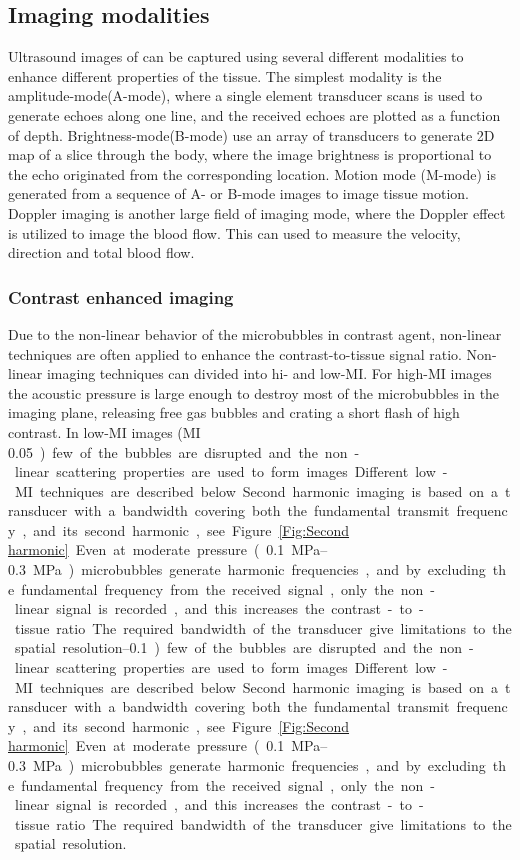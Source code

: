   


\subsection{Imaging modalities}
Ultrasound images of can be captured using several different modalities to enhance different properties of the tissue. The simplest modality is the amplitude-mode(A-mode), where a single element transducer scans is used to generate echoes along one line, and the received echoes are plotted as a function of depth. Brightness-mode(B-mode) use an array of transducers to generate 2D map of a slice through the body, where the image brightness is proportional to the echo originated from the corresponding location. Motion mode (M-mode) is generated from a sequence of A- or B-mode images to image tissue motion. Doppler imaging is another large field of imaging mode, where the Doppler effect is utilized to image the blood flow. This can used to measure the velocity, direction and total blood flow.    

\subsubsection{Contrast enhanced imaging}
\label{sec:contrast img}
Due to the non-linear behavior of the microbubbles in contrast agent, non-linear techniques are often applied to enhance the contrast-to-tissue signal ratio. Non-linear imaging techniques can divided into hi- and low-MI.  For high-MI images the acoustic pressure is large enough to destroy most of the microbubbles in the imaging plane, releasing free gas bubbles and crating a short flash of high contrast. In low-MI images (MI \SIrange{0.05}{0.1}) few of the bubbles are disrupted and the non-linear scattering properties are used to form images. Different low-MI techniques are described below.

Second harmonic imaging is based on a transducer with a bandwidth covering both the fundamental transmit frequency, and its second harmonic, see Figure \ref{Fig:Second harmonic}. Even at moderate pressure (\SIrange{0.1}{0.3}{\mega\pascal}) microbubbles generate harmonic frequencies, and by excluding the fundamental frequency from the received signal, only the non-linear signal is recorded, and this increases the contrast-to-tissue ratio. The required bandwidth of the transducer give limitations to the spatial resolution. 


